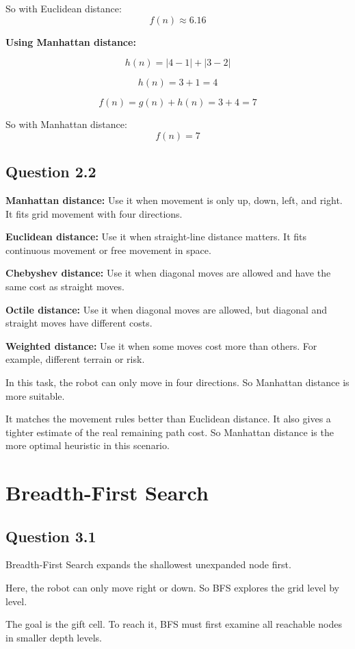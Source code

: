 \documentclass[paper=a4, fontsize=11pt]{scrartcl}
\begin{document}
So with Euclidean distance:
\[
f(n) \approx 6.16
\]

\textbf{Using Manhattan distance:}

\[
h(n) = |4-1| + |3-2|
\]

\[
h(n) = 3 + 1 = 4
\]

\[
f(n) = g(n) + h(n) = 3 + 4 = 7
\]

So with Manhattan distance:
\[
f(n) = 7
\]

\subsection*{Question 2.2}
\textbf{Manhattan distance:}  
Use it when movement is only up, down, left, and right.  
It fits grid movement with four directions.

\textbf{Euclidean distance:}  
Use it when straight-line distance matters.  
It fits continuous movement or free movement in space.

\textbf{Chebyshev distance:}  
Use it when diagonal moves are allowed and have the same cost as straight moves.

\textbf{Octile distance:}  
Use it when diagonal moves are allowed, but diagonal and straight moves have different costs.

\textbf{Weighted distance:}  
Use it when some moves cost more than others.  
For example, different terrain or risk.

In this task, the robot can only move in four directions.  
So Manhattan distance is more suitable.

It matches the movement rules better than Euclidean distance.  
It also gives a tighter estimate of the real remaining path cost.  
So Manhattan distance is the more optimal heuristic in this scenario.

\section{Breadth-First Search}

\subsection*{Question 3.1}
Breadth-First Search expands the shallowest unexpanded node first.

Here, the robot can only move right or down.  
So BFS explores the grid level by level.

The goal is the gift cell.  
To reach it, BFS must first examine all reachable nodes in smaller depth levels.
\end{document}

